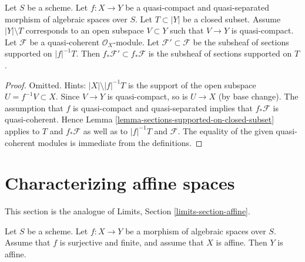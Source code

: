 \begin{lemma}
\label{lemma-push-sections-supported-on-closed-subset}
Let $S$ be a scheme.
Let $f : X \to Y$ be a quasi-compact and quasi-separated morphism
of algebraic spaces over $S$. Let $T \subset |Y|$ be a closed subset.
Assume $|Y| \setminus T$ corresponds to an open subspace $V \subset Y$
such that $V \to Y$ is quasi-compact. Let $\mathcal{F}$ be a quasi-coherent
$\mathcal{O}_X$-module. Let $\mathcal{F}' \subset \mathcal{F}$
be the subsheaf of sections supported on $|f|^{-1}T$.
Then $f_*\mathcal{F}' \subset f_*\mathcal{F}$ is the subsheaf
of sections supported on $T$.
\end{lemma}

\begin{proof}
Omitted. Hints: $|X| \setminus |f|^{-1}T$ is the support of the open subspace
$U = f^{-1}V \subset X$. Since $V \to Y$ is quasi-compact, so is
$U \to X$ (by base change). The assumption that $f$ is quasi-compact and
quasi-separated implies that $f_*\mathcal{F}$ is quasi-coherent.
Hence Lemma \ref{lemma-sections-supported-on-closed-subset}
applies to $T$ and $f_*\mathcal{F}$ as well as to
$|f|^{-1}T$ and $\mathcal{F}$. The equality of the given quasi-coherent
modules is immediate from the definitions.
\end{proof}















\section{Characterizing affine spaces}
\label{section-affine}

\noindent
This section is the analogue of Limits, Section \ref{limits-section-affine}.

\begin{lemma}
\label{lemma-affine}
Let $S$ be a scheme. Let $f : X \to Y$ be a morphism of algebraic spaces
over $S$. Assume that $f$ is surjective and finite, and assume that $X$
is affine. Then $Y$ is affine.
\end{lemma}

